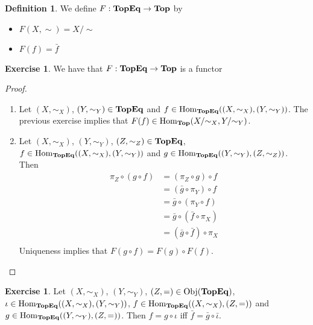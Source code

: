 \documentclass[12pt]{amsart}
\theoremstyle{definition}
\newtheorem{defn}[definition]{Definition}
\newtheorem{ex}[definition]{Exercise}
\newcommand{\tbf}[1]{\textbf{#1}}
\DeclareMathOperator{\Obj}{Obj}
\DeclareMathOperator{\Hom}{Hom}
\DeclareMathOperator*{\0}{\mbf{0}}
\DeclareMathOperator*{\1}{\mbf{1}}
\DeclareMathOperator*{\TopEq}{\text{\tbf{TopEq}}}
\DeclareMathOperator*{\Top}{\text{\tbf{Top}}}
\begin{document}
	\begin{defn}
		We define $F: \TopEq \rightarrow \Top$ by
		\begin{itemize}
			\item $F(X, \sim) = X/\sim$
			\item $F(f) = \bar{f}$
		\end{itemize}
	\end{defn}

	\begin{ex}
		We have that $F: \TopEq \rightarrow \Top$ is a functor
	\end{ex}

	\begin{proof}\
		\begin{enumerate}
			\item Let $(X, \sim_X)$, $(Y, \sim_Y) \in \TopEq$ and $f \in \Hom_{\TopEq}((X, \sim_X), (Y, \sim_Y))$. The previous exercise implies that $F(f) \in \Hom_{\Top}(X/{\sim_X}, Y/ {\sim_Y})$. 
			\item  Let $(X, \sim_X)$, $(Y, \sim_Y)$, $(Z, \sim_Z) \in \TopEq$,  $f \in \Hom_{\TopEq}((X, \sim_X), (Y, \sim_Y))$ and $g \in \Hom_{\TopEq}((Y, \sim_Y), (Z, \sim_Z))$. Then 
			\begin{align*}
				\pi_Z \circ (g \circ f)
				& = (\pi_Z \circ g) \circ f \\
				& = (\bar{g} \circ \pi_Y) \circ f \\
				& = \bar{g} \circ (\pi_Y \circ f) \\
				& = \bar{g} \circ (\bar{f} \circ \pi_X) \\
				& = (\bar{g} \circ \bar{f}) \circ \pi_X \\
			\end{align*}
			Uniqueness implies that $F(g \circ f) = F(g) \circ F(f)$. 
		\end{enumerate}
	\end{proof}

	\begin{ex}
		Let $(X, \sim_X)$, $(Y, \sim_Y)$, $(Z, =)  \in \Obj(\TopEq)$, $\iota \in \Hom_{\TopEq}((X, \sim_X), (Y, \sim_Y))$,  $ f \in \Hom_{\TopEq}((X, \sim_X), (Z, =))$ and  $ g \in \Hom_{\TopEq}((Y, \sim_Y), (Z, =))$. 
		Then $f = g \circ \iota $ iff $\bar{f} = \bar{g} \circ \bar{\iota}$.
	\end{ex}
\end{document}
